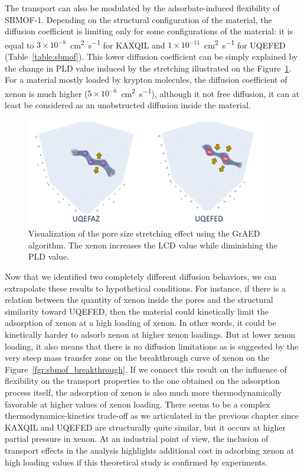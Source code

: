 \documentclass[main]{subfiles}
\begin{document}
The transport can also be modulated by the adsorbate-induced flexibility of SBMOF-1. Depending on the structural configuration of the material, the diffusion coefficient is limiting only for some configurations of the material: it is equal to $3\times10^{-8}$~\si{\square\cm\per\s} for KAXQIL and $1\times10^{-11}$~\si{\square\cm\per\s} for UQEFED (Table~\ref{table:sbmof}). This lower diffusion coefficient can be simply explained by the change in PLD value induced by the stretching illustrated on the Figure~\ref{fgr:stretch}. For a material mostly loaded by krypton molecules, the diffusion coefficient of xenon is much higher ($5\times10^{-6}$~\si{\square\cm\per\s}), although it not free diffusion, it can at least be considered as an unobstructed diffusion inside the material. 

\begin{figure}[ht]
  \centering
  \includegraphics[width=0.95\textwidth]{figures/6-perspectives/KAXQIL_stretch.pdf}
  \caption{ Visualization of the pore size stretching effect using the GrAED algorithm. The xenon increases the LCD value while diminishing the PLD value. }\label{fgr:stretch}
\end{figure}

Now that we identified two completely different diffusion behaviors, we can extrapolate these results to hypothetical conditions. For instance, if there is a relation between the quantity of xenon inside the pores and the structural similarity toward UQEFED, then the material could kinetically limit the adsorption of xenon at a high loading of xenon. In other words, it could be kinetically harder to adsorb xenon at higher xenon loadings. But at lower xenon loading, it also means that there is no diffusion limitations as is suggested by the very steep mass transfer zone on the breakthrough curve of xenon on the Figure~\ref{fgr:sbmof_breakthrough}. If we connect this result on the influence of flexibility on the transport properties to the one obtained on the adsorption process itself, the adsorption of xenon is also much more thermodynamically favorable at higher values of xenon loading. There seems to be a complex thermodynamics-kinetics trade-off as we articulated in the previous chapter since KAXQIL and UQEFED are structurally quite similar, but it occurs at higher partial pressure in xenon. At an industrial point of view, the inclusion of transport effects in the analysis highlights additional cost in adsorbing xenon at high loading values if this theoretical study is confirmed by experiments.
\end{document}
